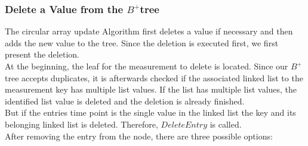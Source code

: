 \documentclass[abstracton,12pt]{scrreprt}
\begin{document}
\subsubsection{Delete a Value from the $B^+$tree}
\label{delete}
The circular array update Algorithm first deletes a value if necessary and then adds the new value to the tree. Since the deletion is executed first, we first present the deletion. \\
At the beginning, the leaf for the measurement to delete is located. 
Since our $B^+$tree accepts duplicates, it is afterwards checked if the associated linked list to the measurement key has multiple list values. If the list has multiple list values, the identified list value is deleted and the deletion is already finished. \\
But if the entries time point is the single value in the linked list the key and its belonging linked list is deleted. Therefore, $DeleteEntry$ is called.\\
After removing the entry from the node, there are three possible options: 
\end{document}
